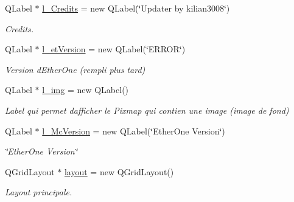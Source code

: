 \begin{DoxyCompactItemize}
Q\+Label $\ast$ \hyperlink{classmainWindow_a22d779eb0b5a74e95f179e6bb4585114}{l\+\_\+\+Credits} = new Q\+Label(\char`\"{}Updater by kilian3008\char`\"{})
\begin{DoxyCompactList}\small\item\em Credits. \end{DoxyCompactList}\item 
\mbox{\label{classmainWindow_af5b764a80941f571b361459be4e25ad6}} 
Q\+Label $\ast$ \hyperlink{classmainWindow_af5b764a80941f571b361459be4e25ad6}{l\+\_\+et\+Version} = new Q\+Label(\char`\"{}E\+R\+R\+OR\char`\"{})
\begin{DoxyCompactList}\small\item\em Version d\textquotesingle{}Ether\+One (rempli plus tard) \end{DoxyCompactList}\item 
\mbox{\label{classmainWindow_afccd91e503dac34c0bfd1e18a7876125}} 
Q\+Label $\ast$ \hyperlink{classmainWindow_afccd91e503dac34c0bfd1e18a7876125}{l\+\_\+img} = new Q\+Label()
\begin{DoxyCompactList}\small\item\em Label qui permet d\textquotesingle{}afficher le Pixmap qui contien une image (image de fond) \end{DoxyCompactList}\item 
\mbox{\label{classmainWindow_a1ac73cd332002dbf7057e9f39f123bfa}} 
Q\+Label $\ast$ \hyperlink{classmainWindow_a1ac73cd332002dbf7057e9f39f123bfa}{l\+\_\+\+Mc\+Version} = new Q\+Label(\char`\"{}Ether\+One Version\char`\"{})
\begin{DoxyCompactList}\small\item\em \char`\"{}\+Ether\+One Version\char`\"{} \end{DoxyCompactList}\item 
\mbox{\label{classmainWindow_a3dcd7d9704d0284fd91442e4cc1ec721}} 
Q\+Grid\+Layout $\ast$ \hyperlink{classmainWindow_a3dcd7d9704d0284fd91442e4cc1ec721}{layout} = new Q\+Grid\+Layout()
\begin{DoxyCompactList}\small\item\em Layout principale. \end{DoxyCompactList}\item 
\mbox{\label{classmainWindow_aed7a3201ec1a3481d2f4d6446fd02569}} 

\end{DoxyCompactItemize}
